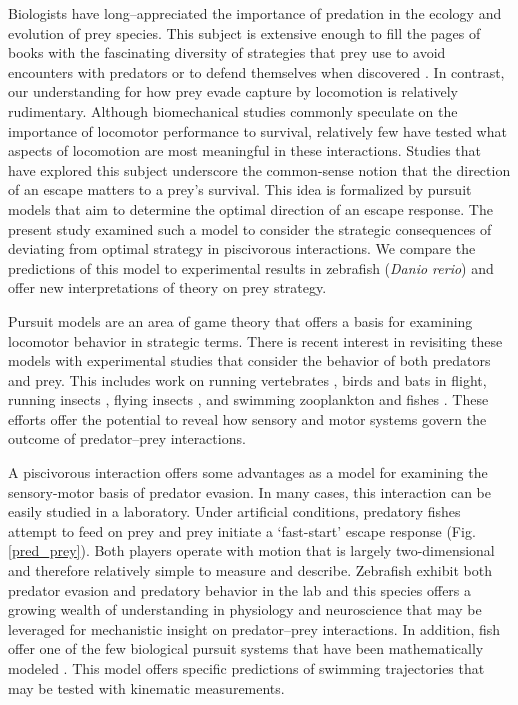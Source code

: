 \documentclass[12pt]{article}
\begin{document}
Biologists have long--appreciated the importance of predation in the ecology
and evolution of prey species. This subject is extensive enough to fill the
pages of books with the fascinating diversity of strategies that prey use to
avoid encounters with predators \citep[e.g.][]{Ruxton:2004vb} or to defend
themselves when discovered \citep[e.g.][]{Emlen:2014wb, Evans:1990va}. In
contrast, our understanding for how prey evade capture by locomotion is
relatively rudimentary. Although biomechanical studies commonly speculate on
the importance of locomotor performance to survival, relatively few have tested
what aspects of locomotion are most meaningful in these interactions. Studies
that have explored this subject \citep[reviewed by][]{Domenici:2011tv}
underscore the common-sense notion that the direction of an escape matters to a
prey's survival. This idea is formalized by pursuit models that aim to
determine the optimal direction of an escape response. The present study
examined such a model \citep{Weihs:1984tb} to consider the strategic
consequences of deviating from optimal strategy in piscivorous interactions. We
compare the predictions of this model to experimental results in zebrafish
(\textit{Danio rerio}) \citep{Stewart:2014cm} and offer new interpretations of
theory on prey strategy.

Pursuit models are an area of game theory that offers a basis for examining
locomotor behavior in strategic terms. There is recent interest in revisiting
these models \citep[e.g.][]{Howland:1974, Weihs:1984tb} with experimental
studies that consider the behavior of both predators and prey. This includes
work on running vertebrates \citep[e.g.][]{Wilson:2014fd}, birds
\citep[e.g.][]{Hedenstrom:2001do, Kullberg:1998ur} and bats
\citep[e.g.][]{Ghose:2006dk} in flight, running insects
\citep{Domenici:2008kra}, flying insects \citep[e.g.][]{Combes:2012eta}, and
swimming zooplankton \citep[e.g.][]{Arnott:1999wx, Heuch:2007kk} and fishes
\citep[e.g.][]{Domenici:2000un}. These efforts offer the potential to reveal
how sensory and motor systems govern the outcome of predator--prey
interactions. 

A piscivorous interaction offers some advantages as a model for examining the
sensory-motor basis of predator evasion. In many cases, this interaction can be
easily studied in a laboratory. Under artificial conditions, predatory fishes
attempt to feed on prey and prey initiate a `fast-start' escape response (Fig.
\ref{pred_prey}). Both players operate with motion that is largely
two-dimensional and therefore relatively simple to measure and describe.
Zebrafish exhibit both predator evasion and predatory behavior in the lab
\citep{Stewart:2013bh} and this species offers a growing wealth of
understanding in physiology and neuroscience \citep[e.g.][]{McLean:2011gi,
Briggs:2002uf} that may be leveraged for mechanistic insight on predator--prey
interactions. In addition, fish offer one of the few biological pursuit systems
that have been mathematically modeled \citep{Weihs:1984tb}. This model offers
specific predictions of swimming trajectories that may be tested with kinematic
measurements. 
\end{document}
